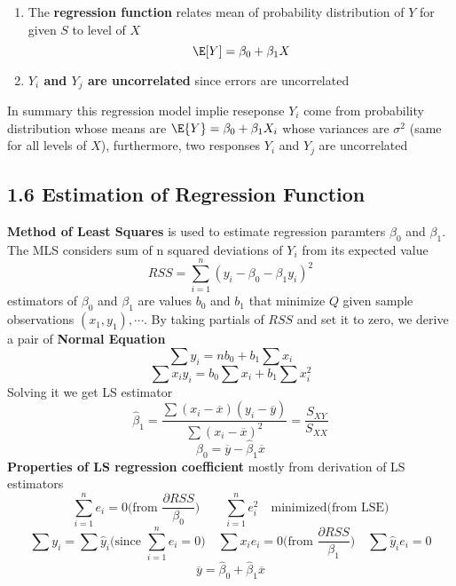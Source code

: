 \documentclass[11pt]{article}
\begin{document}
\begin{defn*}
\begin{enumerate}
        \item The \textbf{regression function} relates mean of probability distribution of $Y$ for given $S$ to level of $X$
        \[
            \E[Y] = \beta_0 + \beta_1 X
        \]
        \item \textbf{$Y_i$ and $Y_j$ are uncorrelated} since errors are uncorrelated 
    \end{enumerate}
    In summary this regression model implie reseponse $Y_i$ come from probability distribution whose means are $\E\{ Y \} = \beta_0 + \beta_1 X_i$ whose variances are $\sigma^2$ (same for all levels of $X$), furthermore, two responses $Y_i$ and $Y_j$ are uncorrelated
\end{defn*}


\subsection*{1.6 Estimation of Regression Function}


\begin{defn*}
    \textbf{Method of Least Squares} is used to estimate regression paramters $\beta_0$ and $\beta_1$. The MLS considers sum of n squared deviations of $Y_i$ from its expected value 
    \[
        RSS = \sum_{i=1}^n (y_i - \beta_0 - \beta_1 y_i)^2
    \]
    estimators of $\beta_0$ and $\beta_1$ are values $b_0$ and $b_1$ that minimize $Q$ given sample observations $(x_1, y_1), \cdots$. By taking partials of $RSS$ and set it to zero, we derive a pair of \textbf{Normal Equation}
    \[
        \sum y_i = nb_0 + b_1 \sum x_i
    \]
    \[
        \sum x_i y_i = b_0 \sum x_i + b_1 \sum x_i^2
    \]
    Solving it we get LS estimator 
    \[
        \hat{\beta}_1 = \frac{\sum (x_i - \overline{x})(y_i - \overline{y})}{\sum (x_i - \overline{x})^2} = \frac{S_{XY}}{S_{XX}}
    \]
    \[
        \hat{\beta}_0 = \overline{y} - \hat{\beta}_1 \overline{x}
    \]
    \textbf{Properties of LS regression coefficient} mostly from derivation of LS estimators
    \[
        \sum_{i=1}^n e_i = 0 \text{(from $\frac{\partial RSS}{\beta_0}$)} \quad \quad \sum_{i=1}^n e_i^2 \quad \text{minimized} \text{(from LSE)}
    \]
    \[
        \sum y_i = \sum \hat{y}_i \text{(since $\sum_{i=1}^n e_i = 0$)} \quad \sum x_i e_i = 0 \text{(from $\frac{\partial RSS}{\beta_1}$)} \quad \sum \hat{y}_i e_i = 0
    \]
    \[
        \overline{y} = \hat{\beta}_0 + \hat{\beta}_1 \overline{x}
    \]
\end{defn*}
\end{document}
